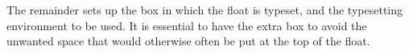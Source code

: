     \begin{teX}
\def\@xfloat #1[#2]{%
  \@nodocument 
  \def \@captype {#1}%
   \def \@fps {#2}%
   \@onelevel@sanitize \@fps 
   \def \reserved@b {!}%
   \ifx \reserved@b \@fps
     \@fpsadddefault
   \else
     \ifx \@fps \@empty
       \@fpsadddefault
     \fi
   \fi
   \ifhmode
     \@bsphack
     \@floatpenalty -\@Mii
   \else
     \@floatpenalty-\@Miii
   \fi
  \ifinner
     \@parmoderr\@floatpenalty\z@
  \else
%  
    \@next\@currbox\@freelist
      {%
       \@tempcnta \sixt@@n
       
       \expandafter \@tfor \expandafter \reserved@a
         \expandafter :\expandafter =\@fps 
         \do
          {%
           \if \reserved@a h%
             \ifodd \@tempcnta
             \else
               \advance \@tempcnta \@ne
             \fi
           \fi
           \if \reserved@a t%
             \@setfpsbit \tw@
             
           \fi
           \if \reserved@a b%
              
             \@setfpsbit 4%
           \fi
           \if \reserved@a p%
             \@setfpsbit 8%
           \fi
           \if \reserved@a !%
             \ifnum \@tempcnta>15
               \advance\@tempcnta -\sixt@@n\relax
             \fi
           \fi
           }%
       \@tempcntb \csname ftype@\@captype \endcsname
       
       \multiply \@tempcntb \@xxxii
       \advance \@tempcnta \@tempcntb
       
       \global \count\@currbox \@tempcnta
       }%
    \@fltovf  %
  \fi
    \end{teX}
    
    The remainder sets up the box in which the float is typeset, and
    the typesetting environment to be used.  It is essential to have
    the extra box to avoid the unwanted space that would otherwise
    often be put at the top of the float.

